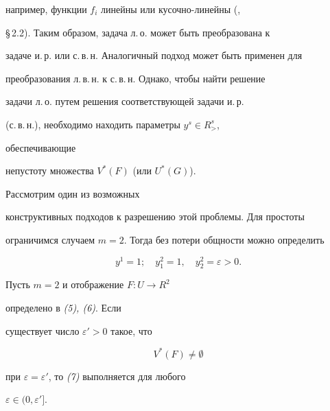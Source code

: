 например, функции $f_i$ линейны или кусочно-линейны (\cite{Pod2},


\S\,2.2). Таким образом, задача л.\,о. может быть преобразована к


задаче и.\,р. или с.\,в.\,н. Аналогичный подход может быть применен для


преобразования л.\,в.\,н. к с.\,в.\,н. Однако, чтобы найти решение


задачи л.\,о. путем решения соответствующей задачи и.\,р.


(с.\,в.\,н.), необходимо находить параметры $y^s\in R^s_{>}$,


обеспечивающие


непустоту множества $V^*(F)$ (или $U^*(G)$).


Рассмотрим один из возможных


конструктивных подходов к разрешению этой проблемы. Для простоты


ограничимся случаем $m=2$. Тогда без потери общности можно определить


\begin{equation}


y^1=1;\quad y^2_1=1,\quad y^2_2=\varepsilon>0.


\end{equation}





\begin{thms}


Пусть $m=2$ и отображение $F:U\to R^2$


определено в {\em (5), (6)}. Если


существует число $\varepsilon'>0$ такое, что


\begin{equation}


V^*(F)\ne\emptyset


\end{equation}


при $\varepsilon=\varepsilon'$, то {\em (7)} выполняется для любого


$\varepsilon\in(0,\varepsilon']$.


\end{thms}





